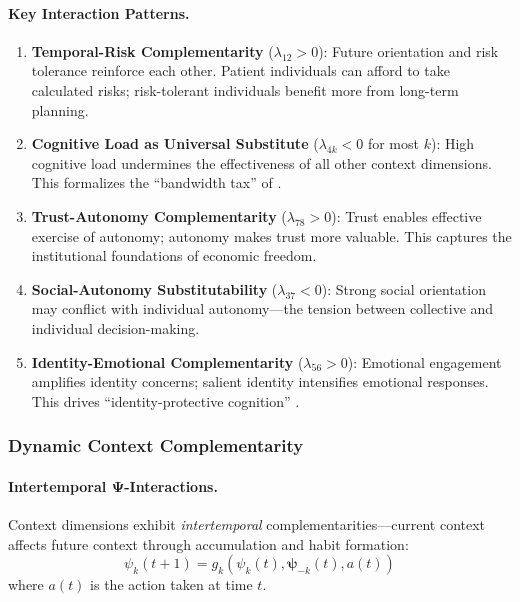 \paragraph{Key Interaction Patterns.}

\begin{enumerate}
    \item \textbf{Temporal-Risk Complementarity} ($\lambda_{12} > 0$): Future orientation 
    and risk tolerance reinforce each other. Patient individuals can afford to take 
    calculated risks; risk-tolerant individuals benefit more from long-term planning.
    
    \item \textbf{Cognitive Load as Universal Substitute} ($\lambda_{4k} < 0$ for most $k$): 
    High cognitive load undermines the effectiveness of all other context dimensions. 
    This formalizes the ``bandwidth tax'' of \citet{PAP-mullainathan2013scarcity}.
    
    \item \textbf{Trust-Autonomy Complementarity} ($\lambda_{78} > 0$): Trust enables 
    effective exercise of autonomy; autonomy makes trust more valuable. This captures 
    the institutional foundations of economic freedom.
    
    \item \textbf{Social-Autonomy Substitutability} ($\lambda_{37} < 0$): Strong social 
    orientation may conflict with individual autonomy---the tension between collective 
    and individual decision-making.
    
    \item \textbf{Identity-Emotional Complementarity} ($\lambda_{56} > 0$): Emotional 
    engagement amplifies identity concerns; salient identity intensifies emotional 
    responses. This drives ``identity-protective cognition'' \citep{kahan2017cultural}.
\end{enumerate}

\subsubsection{Dynamic Context Complementarity}

\paragraph{Intertemporal Ψ-Interactions.}

Context dimensions exhibit \emph{intertemporal} complementarities---current context 
affects future context through accumulation and habit formation:
\begin{equation}
\psi_k(t+1) = g_k(\psi_k(t), \boldsymbol{\psi}_{-k}(t), a(t))
\end{equation}
where $a(t)$ is the action taken at time $t$.

